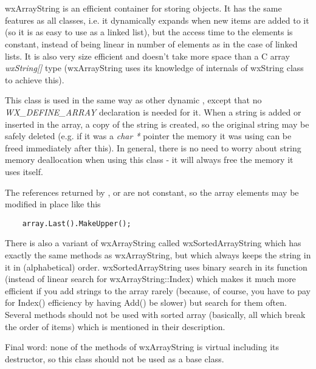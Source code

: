 \section{}\label{wxarraystring}

wxArrayString is an efficient container for storing 
 objects. It has the same features as all 
 classes, i.e. it dynamically expands when new items
are added to it (so it is as easy to use as a linked list), but the access
time to the elements is constant, instead of being linear in number of
elements as in the case of linked lists. It is also very size efficient and
doesn't take more space than a C array {\it wxString[]} type (wxArrayString
uses its knowledge of internals of wxString class to achieve this).

This class is used in the same way as other dynamic ,
except that no {\it WX\_DEFINE\_ARRAY} declaration is needed for it. When a
string is added or inserted in the array, a copy of the string is created, so
the original string may be safely deleted (e.g. if it was a {\it char *} 
pointer the memory it was using can be freed immediately after this). In
general, there is no need to worry about string memory deallocation when using
this class - it will always free the memory it uses itself.

The references returned by , 
 or 
 are not constant, so the
array elements may be modified in place like this

\begin{verbatim}
    array.Last().MakeUpper();
\end{verbatim}

There is also a variant of wxArrayString called wxSortedArrayString which has
exactly the same methods as wxArrayString, but which always keeps the string
in it in (alphabetical) order. wxSortedArrayString uses binary search in its 
 function (instead of linear search for
wxArrayString::Index) which makes it much more efficient if you add strings to
the array rarely (because, of course, you have to pay for Index() efficiency
by having Add() be slower) but search for them often. Several methods should
not be used with sorted array (basically, all which break the order of items)
which is mentioned in their description.

Final word: none of the methods of wxArrayString is virtual including its
destructor, so this class should not be used as a base class.

